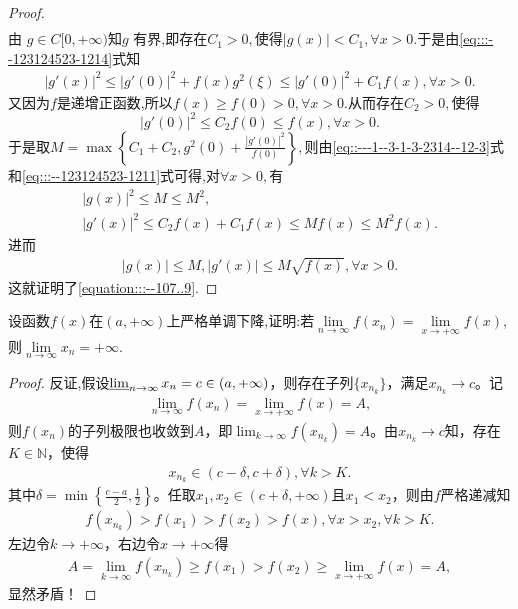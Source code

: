 \documentclass[../../main.tex]{subfiles}%
\begin{document}
\begin{proof}
\begin{align}
\end{align}
由 \( g\in C[0,+\infty) \)知$g$ 有界,即存在$C_1>0,$使得$|g(x)|<C_1,\forall x>0.$于是由\eqref{eq:::--123124523-1214}式知
\begin{align}
\left| g' (x) \right|^2\leqslant \left| g' (0) \right|^2+f(x)g^2(\xi )\leqslant \left| g' (0) \right|^2+C_1f(x),\forall x>0.\label{eq::---1--3-1-3-2314--12-3}
\end{align}
又因为$f$是递增正函数,所以$f(x)\geqslant f(0)>0,\forall x>0.$从而存在$C_2>0,$使得
$$
|g'(0)|^2\leqslant C_2f(0)\leqslant f(x),\forall x>0.
$$
于是取$M=\max \left\{ C_1+C_2,g^2(0)+\frac{\left| g' (0) \right|^2}{f(0)} \right\},$则由\eqref{eq::---1--3-1-3-2314--12-3}式和\eqref{eq:::--123124523-1211}式可得,对$\forall x>0,$有
\begin{gather*}
\left| g\left( x \right) \right|^2\leqslant M\leqslant M^2,
\\
\left| g' (x) \right|^2\leqslant C_2f\left( x \right) +C_1f(x)\leqslant Mf\left( x \right) \leqslant M^2f\left( x \right) .
\end{gather*}
进而
\begin{align*}
\left| g\left( x \right) \right|\leqslant M,\left| g'(x) \right|\leqslant M\sqrt{f\left( x \right)},\forall x>0.
\end{align*}
这就证明了\eqref{equation:::--107..9}.

\end{proof}

\begin{example}
设函数$f(x)$在$(a,+\infty)$上严格单调下降,证明:若$\lim\limits_{n \to \infty} f(x_n)=\lim\limits_{x \to +\infty} f(x)$,则$\lim\limits_{n \to \infty} x_n=+\infty$. 
\end{example}
\begin{proof}

反证,假设$\varliminf_{n\rightarrow \infty}x_n=c\in \left( a,+\infty \right)$，则存在子列$\{ x_{n_k} \}$，满足$x_{n_k}\rightarrow c$。记
\begin{align*}
\lim_{n\rightarrow \infty}f\left( x_n \right) =\lim_{x\rightarrow +\infty}f\left( x \right) =A,
\end{align*}
则$f\left( x_n \right)$的子列极限也收敛到$A$，即$\lim_{k\rightarrow \infty}f\left( x_{n_k} \right) =A$。由$x_{n_k}\rightarrow c$知，存在$K\in \mathbb{N}$，使得
\begin{align*}
x_{n_k}\in \left( c-\delta ,c+\delta \right),\forall k>K.
\end{align*}
其中$\delta =\min \left\{ \frac{c-a}{2},\frac{1}{2} \right\}$。任取$x_1,x_2\in \left( c+\delta ,+\infty \right)$且$x_1<x_2$，则由$f$严格递减知
\begin{align*}
f\left( x_{n_k} \right) >f\left( x_1 \right) >f\left( x_2 \right) >f\left( x \right),\forall x>x_2,\forall k>K.
\end{align*}
左边令$k\rightarrow +\infty$，右边令$x\rightarrow +\infty$得
\begin{align*}
A=\lim_{k\rightarrow \infty}f\left( x_{n_k} \right) \geqslant f\left( x_1 \right) >f\left( x_2 \right) \geqslant \lim_{x\rightarrow +\infty}f\left( x \right) =A,
\end{align*}
显然矛盾！

\end{proof}
\end{document}
